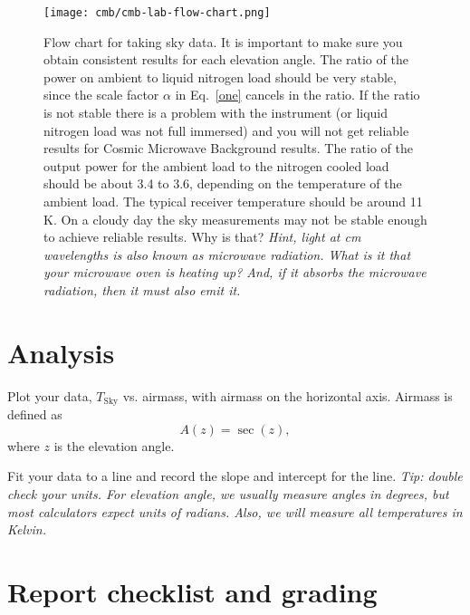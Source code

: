 \begin{figure}
	\begin{center}
		\texttt{[image: cmb/cmb-lab-flow-chart.png]}
		\caption{Flow chart for taking sky data. It is important to make sure you obtain consistent results for each elevation angle. The ratio of the power on ambient to liquid nitrogen load should be very stable, since the scale factor $\alpha$ in Eq.~\ref{one} cancels in the ratio.  If the ratio is not stable there is a problem with the instrument (or liquid nitrogen load was not full immersed) and you will not get reliable results for Cosmic Microwave Background results.  The ratio of the output power for the ambient load to the nitrogen cooled load should be about 3.4 to 3.6, depending on the temperature of the ambient load. The typical receiver temperature should be around 11 K.  On a cloudy day the sky measurements may not be stable enough to achieve reliable results.  Why is that? \textit{Hint, light at cm wavelengths is also known as microwave radiation.  What is it that your microwave oven is heating up? And, if it absorbs the microwave radiation, then it must also emit it.}}
		\label{fig:flow-chart}
	\end{center}
\end{figure}

\section{Analysis}

\begin{steps}
	\item\label{cmb:step:plot} Plot your data, $T_\textrm{Sky}$ vs. airmass, with airmass on the horizontal axis. Airmass is defined as
	\begin{equation}
	 A(z) = \sec(z),
	\end{equation}
	where $z$ is the elevation angle.
	
	\item\label{cmb:step:fit} Fit your data to a line and record the slope and intercept for the line. \textit{Tip: double check your units. For elevation angle, we usually measure angles in degrees, but most calculators expect units of radians. Also, we will measure all temperatures in Kelvin.}
\end{steps}

\section{Report checklist and grading}

